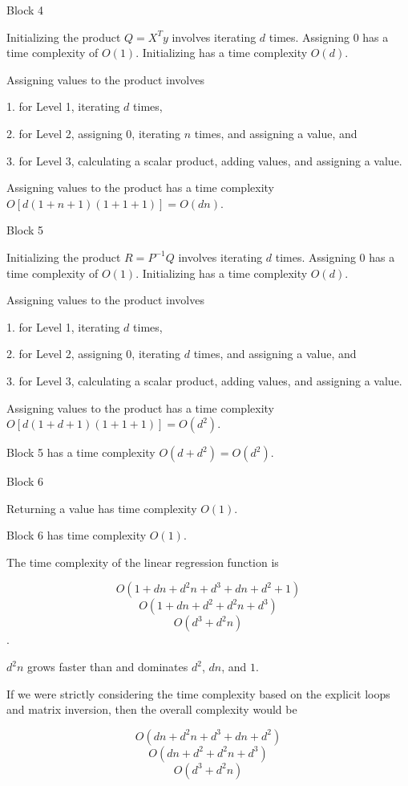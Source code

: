 \documentclass{article}
\begin{document}
Block 4

Initializing the product $Q = X^T y$ involves iterating $d$ times. Assigning $0$ has a time complexity of $O(1)$. Initializing has a time complexity $O\left(d\right)$.

Assigning values to the product involves

1. for Level 1, iterating $d$ times,

2. for Level 2, assigning $0$, iterating $n$ times, and assigning a value, and

3. for Level 3, calculating a scalar product, adding values, and assigning a value.

Assigning values to the product has a time complexity $O[d(1+n+1)(1+1+1)] = O\left(d n\right)$.

Block 5

Initializing the product $R = P^{-1} Q$ involves iterating $d$ times. Assigning $0$ has a time complexity of $O(1)$. Initializing has a time complexity $O\left(d\right)$.

Assigning values to the product involves

1. for Level 1, iterating $d$ times,

2. for Level 2, assigning $0$, iterating $d$ times, and assigning a value, and

3. for Level 3, calculating a scalar product, adding values, and assigning a value.

Assigning values to the product has a time complexity $O[d(1+d+1)(1+1+1)] = O\left(d^2\right)$.

Block 5 has a time complexity $O\left(d + d^2\right) = O\left(d^2\right)$.

Block 6

Returning a value has time complexity $O(1)$.

Block 6 has time complexity $O(1)$.

The time complexity of the linear regression function is

$$O\left(1 + dn + d^2 n + d^3 + dn + d^2 + 1\right)$$
$$O\left(1 + dn + d^2 + d^2 n + d^3\right)$$
$$O\left(d^3 + d^2 n\right)$$.

$d^2 n$ grows faster than and dominates $d^2$, $dn$, and $1$.

If we were strictly considering the time complexity based on the explicit loops and matrix inversion, then the overall complexity would be

$$O\left(dn + d^2n + d^3 + dn + d^2\right)$$
$$O\left(dn + d^2 + d^2 n + d^3\right)$$
$$O\left(d^3 + d^2 n\right)$$
\end{document}
